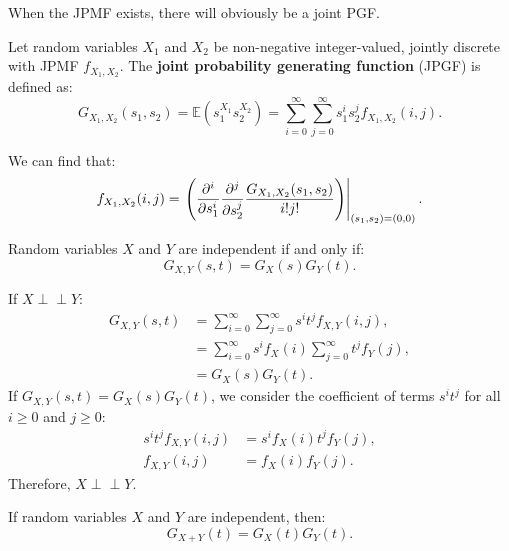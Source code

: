 \documentclass{huhtakm-template-book-v2}
\newcommand{\independent}{\perp\!\!\!\perp}
\newcommand{\expect}{\mathbb{E}}
\begin{document}
    When the JPMF exists, there will obviously be a joint PGF.
    \begin{defn}
        Let random variables $X_{1}$ and $X_{2}$ be non-negative integer-valued, jointly discrete with JPMF $f_{X_{1},X_{2}}$. The \textbf{joint probability generating function} (JPGF) is defined as:
        \begin{equation*}
            G_{X_{1},X_{2}}(s_{1},s_{2}) = \expect(s_{1}^{X_{1}}s_{2}^{X_{2}}) = \sum_{i = 0}^{\infty}\sum_{j = 0}^{\infty}s_{1}^{i}s_{2}^{j}f_{X_{1},X_{2}}(i, j).
        \end{equation*}
    \end{defn}
    \begin{rem}
        We can find that:
        \begin{equation*}
            f_{X_{1},X_{2}}(i, j) = \left.\left(\pdv*[order = {i}]{\pdv*[order = {j}]{\frac{G_{X_{1},X_{2}}(s_{1},s_{2})}{i!j!}}{s_{2}}}{s_{1}}\right)\right|_{(s_{1},s_{2}) = (0,0)}.
        \end{equation*}
    \end{rem}
    \begin{thm}
        Random variables $X$ and $Y$ are independent if and only if:
        \begin{equation*}
            G_{X,Y}(s, t) = G_{X}(s)G_{Y}(t).
        \end{equation*}
    \end{thm}
    \begin{proofing}
        If $X \independent Y$:
        \begin{align*}
            G_{X,Y}(s, t) &= \sum_{i = 0}^{\infty}\sum_{j = 0}^{\infty}s^{i}t^{j}f_{X,Y}(i, j),\\
            &= \sum_{i = 0}^{\infty}s^{i}f_{X}(i)\sum_{j = 0}^{\infty}t^{j}f_{Y}(j),\\
            &= G_{X}(s)G_{Y}(t).
        \end{align*}
        If $G_{X,Y}(s, t) = G_{X}(s)G_{Y}(t)$, we consider the coefficient of terms $s^{i}t^{j}$ for all $i \geq 0$ and $j \geq 0$:
        \begin{align*}
            s^{i}t^{j}f_{X,Y}(i, j) &= s^{i}f_{X}(i)t^{j}f_{Y}(j),\\
            f_{X,Y}(i, j) &= f_{X}(i)f_{Y}(j).
        \end{align*}
        Therefore, $X \independent Y$.
    \end{proofing}
    \begin{thm}
        \label{Chapter 7 (Theorem) PGF for sum of random independent variables}
        If random variables $X$ and $Y$ are independent, then:
        \begin{equation*}
            G_{X+Y}(t) = G_{X}(t)G_{Y}(t).
        \end{equation*}
    \end{thm}
\end{document}
